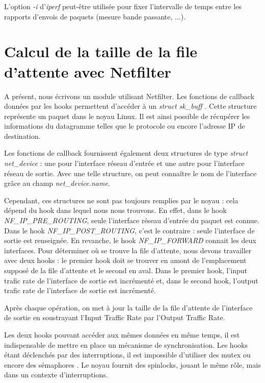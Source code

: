 \documentclass[a4paper]{article}
\begin{document}
L'option \textit{-i} d'\textit{iperf} peut-être utilisée
pour fixer l'intervalle de temps entre les rapports
d'envois de paquets (mesure bande passante, $\ldots$).

\section{Calcul de la taille de la file d'attente avec Netfilter}
A présent, nous écrivons un module utilisant Netfilter. Les
fonctions de callback données par les hooks permettent
d'accéder à un \textit{struct sk\_buff} \cite{skbuff}. Cette structure représente
un paquet dans le noyau Linux. Il est ainsi possible de récupérer
les informations du datagramme telles que le protocole ou encore
l'adresse IP de destination.

Les fonctions de callback fournissent également deux structures
de type \textit{struct net\_device} : une pour l'interface réseau
d'entrée et une autre pour l'interface réseau de sortie. Avec
une telle structure, on peut connaître le nom de l'interface
grâce au champ \textit{net\_device.name}.

Cependant, ces structures ne sont pas toujours remplies par le noyau : cela 
dépend du hook dans lequel nous nous trouvons. En effet, dans le hook \textit{NF\_IP\_PRE\_ROUTING}, 
seule l'interface réseau d'entrée du paquet est connue. Dans le hook \textit{NF\_IP\_POST\_ROUTING}, 
c'est le contraire : seule l'interface de sortie est renseignée. En revanche, le hook \textit{NF\_IP\_FORWARD} 
connait les deux interfaces.
Pour déterminer où se trouve la file d'attente, nous devons travailler avec deux hooks : 
le premier hook doit se trouver en amont de l'emplacement supposé de la file d'attente et le second en aval. 
Dans le premier hook, l'input trafic rate de l'interface de sortie est incrémenté et, dans le second hook, 
l'output trafic rate de l'interface de sortie est incrémenté.
 
Après chaque opération, on met à jour la taille de la file
d'attente de l'interface de sortie en soustrayant l'Input Traffic
Rate par l'Output Traffic Rate.

Les deux hooks pouvant accéder aux mêmes données en même temps,
il est indispensable de mettre en place un mécanisme de
synchronisation. Les hooks étant déclenchés par des interruptions,
il est impossible d'utiliser des mutex ou encore des sémaphores \cite{mutex}.
Le noyau fournit des spinlocks, jouant le même rôle, mais dans
un contexte d'interruptions. \cite{lock}
\end{document}
